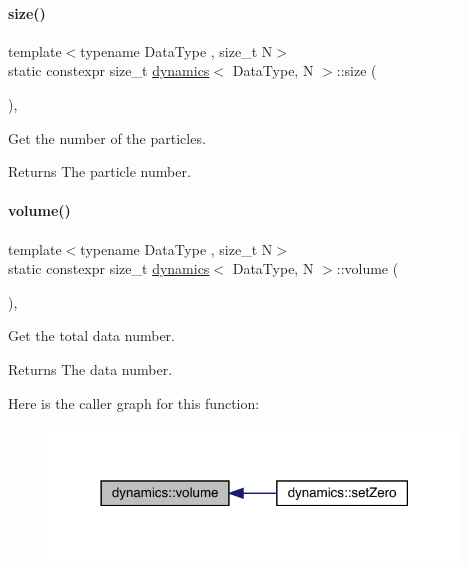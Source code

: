 \paragraph{\texorpdfstring{size()}{size()}}
{\footnotesize\ttfamily template$<$typename Data\+Type , size\+\_\+t N$>$ \\
static constexpr size\+\_\+t \mbox{\hyperlink{classdynamics}{dynamics}}$<$ Data\+Type, N $>$\+::size (\begin{DoxyParamCaption}{ }\end{DoxyParamCaption})\hspace{0.3cm}{\ttfamily [inline]}, {\ttfamily [static]}}



Get the number of the particles. 

\begin{DoxyReturn}{Returns}
The particle number. 
\end{DoxyReturn}
\mbox{\label{classdynamics_ada4a2418d86de3072e1a238a95e6bdb2}} 
\paragraph{\texorpdfstring{volume()}{volume()}}
{\footnotesize\ttfamily template$<$typename Data\+Type , size\+\_\+t N$>$ \\
static constexpr size\+\_\+t \mbox{\hyperlink{classdynamics}{dynamics}}$<$ Data\+Type, N $>$\+::volume (\begin{DoxyParamCaption}{ }\end{DoxyParamCaption})\hspace{0.3cm}{\ttfamily [inline]}, {\ttfamily [static]}}



Get the total data number. 

\begin{DoxyReturn}{Returns}
The data number. 
\end{DoxyReturn}
Here is the caller graph for this function\+:\nopagebreak
\begin{figure}[H]
\begin{center}
\leavevmode
\includegraphics[width=310pt]{classdynamics_ada4a2418d86de3072e1a238a95e6bdb2_icgraph}
\end{center}
\end{figure}


